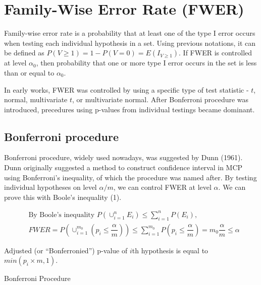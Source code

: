 \documentclass[a4paper, 11pt, oneside]{article}
\makeatletter
\def\BState{\State\hskip-\ALG@thistlm}
\makeatother
\begin{document}
\section{Family-Wise Error Rate (FWER)}
Family-wise error rate is a probability that at least one of the type I error occurs when testing each individual hypothesis in a set. Using previous notations, it can be defined as $P(V \geq 1) = 1 - P(V=0) = E(I_{V \geq 1})$. If FWER is controlled at level $\alpha_0$, then probability that one or more type I error occurs in the set is less than or equal to $\alpha_0$. \par
    In early works, FWER was controlled by using a specific type of test statistic - $t$, normal, multivariate $t$, or multivariate normal. After Bonferroni procedure was introduced, precedures using p-values from individual testings became dominant.

\subsection{Bonferroni procedure}
Bonferroni procedure, widely used nowadays, was suggested by Dunn (1961). Dunn originally suggested a method to construct confidence interval in MCP using Bonferroni's inequality, of which the procedure was named after. By testing individual hypotheses on level $\alpha/m$, we can control FWER at level $\alpha$. We can prove this with Boole's inequality (1).

\begin{equation}
\begin{aligned}\label{proof-bonf}
&\text{By Boole's inequality }P(\cup_{i=1}^{n}E_i)\leq\sum_{i=1}^n P(E_i),\\
& FWER=P(\cup_{i=1}^{m_0}(p_i\leq\dfrac{\alpha}{m}))\leq\sum_{i=1}^{m_0}P(p_i\leq\dfrac{\alpha}{m})=m_0\dfrac{\alpha}m\leq\alpha
\end{aligned}
\end{equation}

Adjusted (or \enquote{Bonferronied}) p-value of $i$th hypothesis is equal to $min(p_i \times m, 1)$.

\begin{algorithm}
\caption{Bonferroni Procedure}\label{bonf}
\end{algorithm}
\end{document}
